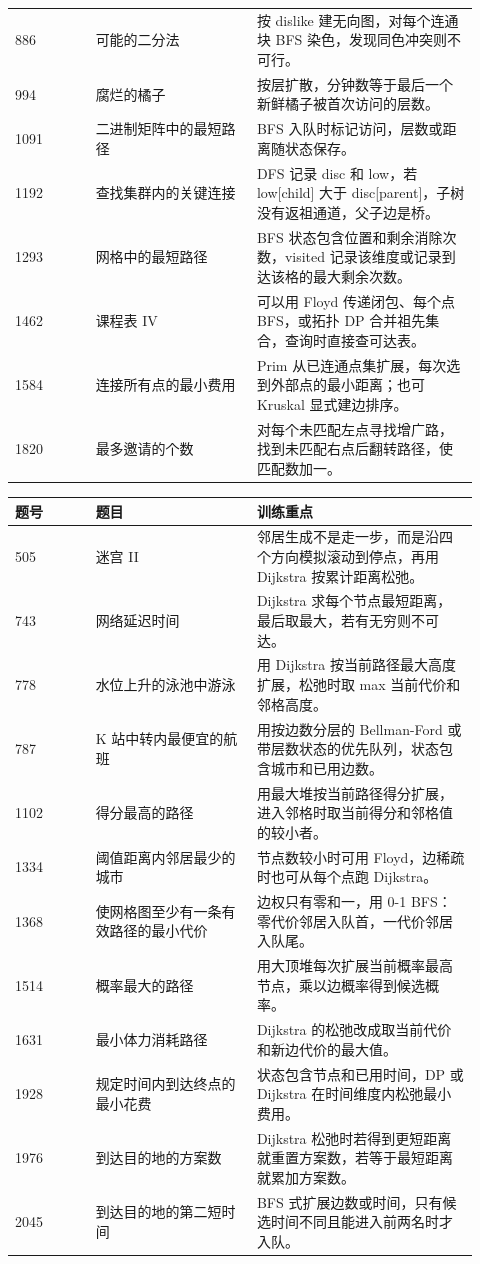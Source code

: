 \begin{longtable}{@{}p{0.16\linewidth}p{0.32\linewidth}p{0.44\linewidth}@{}}
886 & 可能的二分法 & 按 dislike 建无向图，对每个连通块 BFS 染色，发现同色冲突则不可行。\\
994 & 腐烂的橘子 & 按层扩散，分钟数等于最后一个新鲜橘子被首次访问的层数。\\
1091 & 二进制矩阵中的最短路径 & BFS 入队时标记访问，层数或距离随状态保存。\\
1192 & 查找集群内的关键连接 & DFS 记录 disc 和 low，若 low[child] 大于 disc[parent]，子树没有返祖通道，父子边是桥。\\
1293 & 网格中的最短路径 & BFS 状态包含位置和剩余消除次数，visited 记录该维度或记录到达该格的最大剩余次数。\\
1462 & 课程表 IV & 可以用 Floyd 传递闭包、每个点 BFS，或拓扑 DP 合并祖先集合，查询时直接查可达表。\\
1584 & 连接所有点的最小费用 & Prim 从已连通点集扩展，每次选到外部点的最小距离；也可 Kruskal 显式建边排序。\\
1820 & 最多邀请的个数 & 对每个未匹配左点寻找增广路，找到未匹配右点后翻转路径，使匹配数加一。\\
\bottomrule
\end{longtable}


\begin{longtable}{@{}p{0.16\linewidth}p{0.32\linewidth}p{0.44\linewidth}@{}}
\toprule
题号 & 题目 & 训练重点\\
\midrule
\endhead
505 & 迷宫 II & 邻居生成不是走一步，而是沿四个方向模拟滚动到停点，再用 Dijkstra 按累计距离松弛。\\
743 & 网络延迟时间 & Dijkstra 求每个节点最短距离，最后取最大，若有无穷则不可达。\\
778 & 水位上升的泳池中游泳 & 用 Dijkstra 按当前路径最大高度扩展，松弛时取 max 当前代价和邻格高度。\\
787 & K 站中转内最便宜的航班 & 用按边数分层的 Bellman-Ford 或带层数状态的优先队列，状态包含城市和已用边数。\\
1102 & 得分最高的路径 & 用最大堆按当前路径得分扩展，进入邻格时取当前得分和邻格值的较小者。\\
1334 & 阈值距离内邻居最少的城市 & 节点数较小时可用 Floyd，边稀疏时也可从每个点跑 Dijkstra。\\
1368 & 使网格图至少有一条有效路径的最小代价 & 边权只有零和一，用 0-1 BFS：零代价邻居入队首，一代价邻居入队尾。\\
1514 & 概率最大的路径 & 用大顶堆每次扩展当前概率最高节点，乘以边概率得到候选概率。\\
1631 & 最小体力消耗路径 & Dijkstra 的松弛改成取当前代价和新边代价的最大值。\\
1928 & 规定时间内到达终点的最小花费 & 状态包含节点和已用时间，DP 或 Dijkstra 在时间维度内松弛最小费用。\\
1976 & 到达目的地的方案数 & Dijkstra 松弛时若得到更短距离就重置方案数，若等于最短距离就累加方案数。\\
2045 & 到达目的地的第二短时间 & BFS 式扩展边数或时间，只有候选时间不同且能进入前两名时才入队。\\
\bottomrule
\end{longtable}

